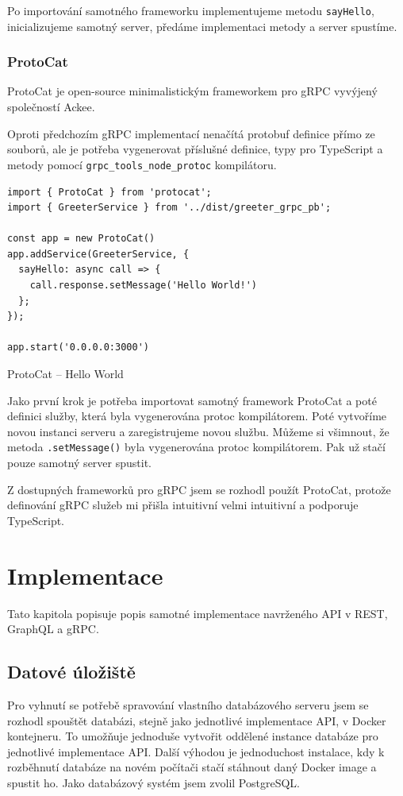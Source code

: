 \documentclass[thesis=M,czech]{FITthesis}[2019/12/23]
\begin{document}
Po importování samotného frameworku implementujeme metodu \texttt{sayHello}, inicializujeme samotný server, předáme implementaci metody a server spustíme.

\subsection{ProtoCat}
ProtoCat \cite{protocat} je open-source minimalistickým frameworkem pro gRPC vyvýjený společností Ackee.

Oproti předchozím gRPC implementací nenačítá protobuf definice přímo ze souborů, ale je potřeba vygenerovat příslušné definice, typy pro TypeScript a metody pomocí \texttt{grpc_tools_node_protoc} kompilátoru.

\begin{listing}[H]
\begin{verbatim}
import { ProtoCat } from 'protocat';
import { GreeterService } from '../dist/greeter_grpc_pb';

const app = new ProtoCat()
app.addService(GreeterService, {
  sayHello: async call => {
    call.response.setMessage('Hello World!')
  };
});
  
app.start('0.0.0.0:3000')
\end{verbatim}
\caption{ProtoCat -- Hello World}
\label{lst:protocat_hello}
\end{listing}

Jako první krok je potřeba importovat samotný framework ProtoCat a poté definici služby, která byla vygenerována protoc kompilátorem. Poté vytvoříme novou instanci serveru a zaregistrujeme novou službu. Můžeme si všimnout, že metoda \texttt{.setMessage()} byla vygenerována protoc kompilátorem. Pak už stačí pouze samotný server spustit.

Z dostupných frameworků pro gRPC jsem se rozhodl použít ProtoCat, protože definování gRPC služeb mi přišla intuitivní velmi intuitivní a podporuje TypeScript.



\chapter{Implementace}
Tato kapitola popisuje popis samotné implementace navrženého API v REST, GraphQL a gRPC.

\section{Datové úložiště}
Pro vyhnutí se potřebě spravování vlastního databázového serveru jsem se rozhodl spouštět databázi, stejně jako jednotlivé implementace API, v Docker kontejneru. To umožňuje jednoduše vytvořit oddělené instance databáze pro jednotlivé implementace API. Další výhodou je jednoduchost instalace, kdy k rozběhnutí databáze na novém počítači stačí stáhnout daný Docker image a spustit ho. Jako databázový systém jsem zvolil PostgreSQL.
\end{document}
